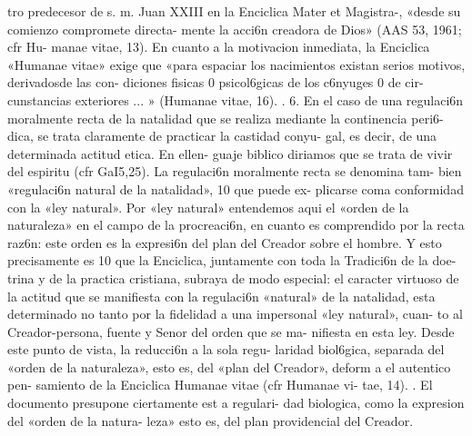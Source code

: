 \documentclass[letterpaper]{report}
\begin{document}
tro predecesor de s. m. Juan XXIII en la Enciclica Mater 
et Magistra-, «desde su comienzo compromete directa-
mente la acci6n creadora de Dios» (AAS 53, 1961; cfr Hu- 
manae vitae, 13). En cuanto a la motivacion inmediata, la 
Enciclica «Humanae vitae» exige que «para espaciar los 
nacimientos existan serios motivos, derivadosde las con- 
diciones fisicas 0 psicol6gicas de los c6nyuges 0 de cir- 
cunstancias exteriores ... » (Humanae vitae, 16). 
. 6. En el caso de una regulaci6n moralmente recta de 
la natalidad que se realiza mediante la continencia peri6- 
dica, se trata claramente de practicar la castidad conyu- 
gal, es decir, de una determinada actitud etica. En ellen- 
guaje biblico diriamos que se trata de vivir del espiritu (cfr 
GaI5,25). 
La regulaci6n moralmente recta se denomina tam- 
bien «regulaci6n natural de la natalidad», 10 que puede ex- 
plicarse coma conformidad con la «ley natural». Por «ley 
natural» entendemos aqui el «orden de la naturaleza» en 
el campo de la procreaci6n, en cuanto es comprendido 
por la recta raz6n: este orden es la expresi6n del plan del 
Creador sobre el hombre. Y esto precisamente es 10 que 
la Enciclica, juntamente con toda la Tradici6n de la doe- 
trina y de la practica cristiana, subraya de modo especial: 
el caracter virtuoso de la actitud que se manifiesta con la 
regulaci6n «natural» de la natalidad, esta determinado no 
tanto por la fidelidad a una impersonal «ley natural», cuan- 
to al Creador-persona, fuente y Senor del orden que se ma- 
nifiesta en esta ley. 
Desde este punto de vista, la reducci6n a la sola regu- 
laridad biol6gica, separada del «orden de la naturaleza», 
esto es, del «plan del Creador», deform a el autentico pen- 
samiento de la Enciclica Humanae vitae (cfr Humanae vi- 
tae, 14). 	. 
El documento presupone ciertamente est a regulari- 
dad biologica, como la expresion del «orden de la natura- 
leza» esto es, del plan providencial del Creador.
	
\end{document}
